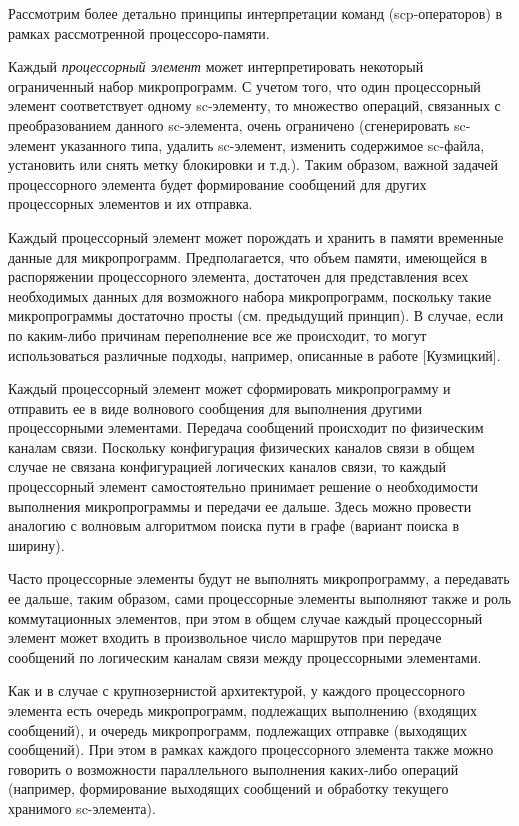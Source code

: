 Рассмотрим более детально принципы интерпретации команд (scp-операторов) в рамках рассмотренной процессоро-памяти.
\begin{textitemize}
	\item Каждый \textit{процессорный элемент} может интерпретировать некоторый ограниченный набор микропрограмм. С учетом того, что один процессорный элемент соответствует одному sc-элементу, то множество операций, связанных с преобразованием данного sc-элемента, очень ограничено (сгенерировать sc-элемент указанного типа, удалить sc-элемент, изменить содержимое sc-файла, установить или снять метку блокировки и т.д.). Таким образом, важной задачей процессорного элемента будет формирование сообщений для других процессорных элементов и их отправка.
	\item Каждый процессорный элемент может порождать и хранить в памяти временные данные для микропрограмм. Предполагается, что объем памяти, имеющейся в распоряжении процессорного элемента, достаточен для представления всех необходимых данных для возможного набора микропрограмм, поскольку такие микропрограммы достаточно просты (см. предыдущий принцип). В случае, если по каким-либо причинам переполнение все же происходит, то могут использоваться различные подходы, например, описанные в работе [Кузмицкий].
	\item Каждый процессорный элемент может сформировать микропрограмму и отправить ее в виде волнового сообщения для выполнения другими процессорными элементами. Передача сообщений происходит по физическим каналам связи. Поскольку конфигурация физических каналов связи в общем случае не связана конфигурацией логических каналов связи, то каждый процессорный элемент самостоятельно принимает решение о необходимости выполнения микропрограммы и передачи ее дальше. Здесь можно провести аналогию с волновым алгоритмом поиска пути в графе (вариант поиска в ширину).
	\item Часто процессорные элементы будут не выполнять микропрограмму, а передавать ее дальше, таким образом, сами процессорные элементы выполняют также и роль коммутационных элементов, при этом в общем случае каждый процессорный элемент может входить в произвольное число маршрутов при передаче сообщений по логическим каналам связи между процессорными элементами.
	\item Как и в случае с крупнозернистой архитектурой, у каждого процессорного элемента есть очередь микропрограмм, подлежащих выполнению (входящих сообщений), и очередь микропрограмм, подлежащих отправке (выходящих сообщений). При этом в рамках каждого процессорного элемента также можно говорить о возможности параллельного выполнения каких-либо операций (например, формирование выходящих сообщений и обработку текущего хранимого sc-элемента).
\end{textitemize}


